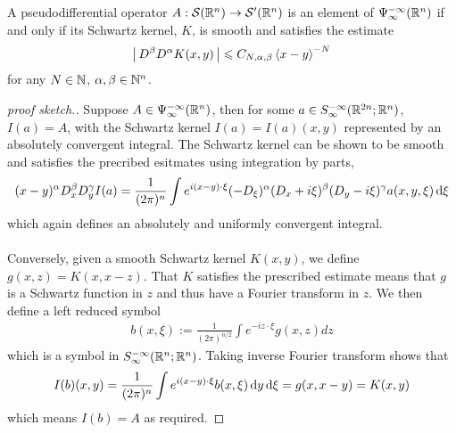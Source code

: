 \documentclass[12pt]{article}
\begin{document}
\begin{fprop} \label{prop : residual operators are smoothing}
    A pseudodifferential operator $A : \sch(\R^n) \to \sch'(\R^n)$ is an element of $\Psi^{-\infty}_{\infty}(\R^n)$ if and only if its Schwartz kernel, $K$, is smooth and satisfies the estimate
    \begin{align*}
    \abs{D^\beta D^\alpha K(x, y)} \leq C_{N, \alpha, \beta} \sym[x - y]^{-N}
    \end{align*}
    for any $N \in \N$, $\alpha, \beta \in \N^n$. 
\end{fprop}
\begin{proof}[proof sketch.] 
    Suppose $A \in \Psi^{-\infty}_{\infty}(\R^n)$, then for some $a \in S^{-\infty}_\infty(\R^{2n}; \R^n)$, $I(a) = A$, with the Schwartz kernel $I(a) = I(a)(x, y)$ represented by an absolutely convergent integral. The Schwartz kernel can be shown to be smooth and satisfies the precribed esitmates using integration by parts, 
    \begin{align*}
    (x - y)^\alpha D^\beta_x D^\gamma_y I(a) = \frac{1}{(2\pi)^n} \int e^{i(x - y) \cdot \xi} (-D_\xi)^\alpha (D_x + i\xi)^\beta (D_y - i\xi)^\gamma  a(x, y, \xi) \d[\xi]
    \end{align*}
    which again defines an absolutely and uniformly convergent integral. \\
    \\
    Conversely, given a smooth Schwartz kernel $K(x, y)$, we define $g(x, z) = K(x, x - z)$. That $K$ satisfies the prescribed estimate means that $g$ is a Schwartz function in $z$ and thus have a Fourier transform in $z$. We then define a left reduced symbol
    \begin{align*}
    b(x, \xi) := \frac{1}{(2\pi)^{n/2}} \int e^{- i z \cdot \xi} g(x, z) dz 
    \end{align*}
    which is a symbol in $S^{-\infty}_\infty(\R^{n}; \R^n)$. Taking inverse Fourier transform shows that
    \begin{align*}
    I(b)(x, y) = \frac{1}{(2\pi)^n} \int e^{i(x - y) \cdot \xi} b(x, \xi) \d[y] \d[\xi] = g(x, x - y) = K(x, y)
    \end{align*}
    which means $I(b) = A$ as required. 

\end{proof}
\end{document}
